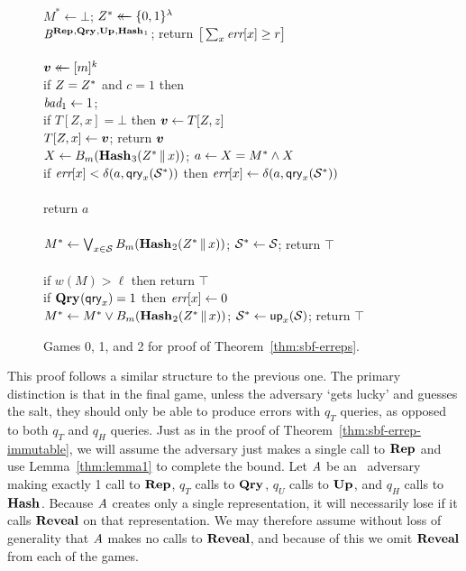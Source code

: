 \begin{figure*}
{
  \vspace{-7pt}
  \\[2pt]
    $M^* \gets \bot$;
    $Z^* \mathrel{\leftarrow\mkern-14mu\leftarrow} \{0,1\}^\lambda$\\
    $\mathit{B}^{\textup{\textbf{Rep}}\hspace{0.5pt},\textup{\textbf{Qry}}\hspace{0.5pt},\textup{\textbf{Up}}\hspace{0.5pt},\textup{\textbf{Hash}}\hspace{0.5pt}_1}$;
    return $\big[\sum_x \textit{err}[x] \geq r\big]$
  \\[6pt]
  \hfill {}\\[2pt]
    $\boldsymbol{v} \mathrel{\leftarrow\mkern-14mu\leftarrow} [m]^k$\\
    if $Z=Z^*$ and $c = 1$ then \\
    \tab $\textit{bad}_1 \gets 1$; \\
    if $T[Z,x] = \bot$ then $\boldsymbol{v} \gets T[Z,z]$\\
    $T[Z,x] \gets \boldsymbol{v}$; return $\boldsymbol{v}$
}
{
  \hfill {}\\[2pt]
    $X \gets {B}_m(\textup{\textbf{Hash}}\hspace{0.5pt}_3(Z^* \, \| \, x))$;
    $a \gets X = M^* \wedge X$\\
    if $\textit{err}[x] < \delta(a,\mathsf{qry}_x(\mathcal{S}^*))$ then
          $\textit{err}[x] \gets \delta(a,\mathsf{qry}_x(\mathcal{S}^*))$\\
    \\
    return $a$
  \\[6pt]
  \oraclev{$\REPO(\col)$}\\[2pt]
    $M^* \gets \bigvee_{x \in \mathcal{S}} {B}_m(\textup{\textbf{Hash}}\hspace{0.5pt}_2(Z^* \, \| \, x))$;
    $\mathcal{S}^* \gets \mathcal{S}$;
    return $\top$
  \\[6pt]
  \\[2pt]
    if $w(M) > \ell$ then return $\top$\\
    if $\textup{\textbf{Qry}}\hspace{0.5pt}(\mathsf{qry}_x) = 1$ then $\textit{err}[x] \gets 0$\\
    $M^* \gets M^* \vee {B}_m(\textup{\textbf{Hash}}\hspace{0.5pt}_2(Z^* \, \| \, x))$;
    $\mathcal{S}^* \gets \mathsf{up}_x(\mathcal{S})$;
    return $\top$
}
\caption{Games 0, 1, and 2 for proof of Theorem~\ref{thm:sbf-erreps}.}
\label{fig:sbf-erreps/games}
\end{figure*}

This proof follows a similar structure to the previous one. The primary distinction is that in the final game, unless the adversary `gets lucky' and guesses the salt, they should only be able to produce errors with $q_T$ queries, as opposed to both $q_T$ and $q_H$ queries.
%
Just as in the proof of Theorem~\ref{thm:sbf-errep-immutable}, we will assume the adversary just makes a single call to $\textup{\textbf{Rep}}\hspace{0.5pt}$ and use Lemma~\ref{thm:lemma1} to complete the bound. Let $\mathit{A}$ be an \erreps\ adversary making exactly 1 call to $\textup{\textbf{Rep}}\hspace{0.5pt}$, $q_T$ calls to $\textup{\textbf{Qry}}\hspace{0.5pt}$, $q_U$ calls to $\textup{\textbf{Up}}\hspace{0.5pt}$, and $q_H$ calls to $\textup{\textbf{Hash}}\hspace{0.5pt}$. Because $\mathit{A}$ creates only a single representation, it will necessarily lose if it calls $\mathbf{Reveal}$ on that representation. We may therefore assume without loss of generality that $\mathit{A}$ makes no calls to $\mathbf{Reveal}$, and because of this we omit $\mathbf{Reveal}$ from each of the games.

